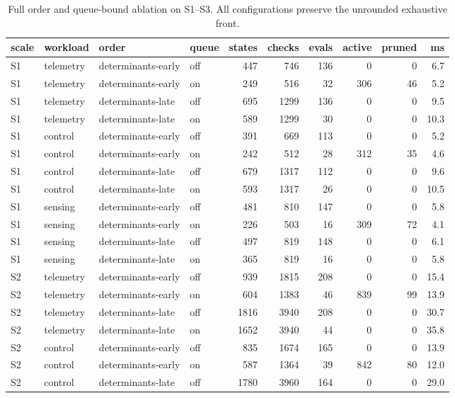 \documentclass[pdflatex,sn-nature]{sn-jnl}
\theoremstyle{thmstyleone}
\theoremstyle{thmstyletwo}
\theoremstyle{thmstylethree}
\begin{document}
\begin{table}[!htbp]\centering
\caption{Full order and queue-bound ablation on S1--S3. All configurations preserve the
unrounded exhaustive front.}\label{tabS7}
{\let\scriptsize\tiny\setlength{\tabcolsep}{2pt}\scriptsize
\begin{tabular}{llllrrrrrr}
\toprule
scale & workload & order & queue & states & checks & evals & active & pruned & ms \\
\midrule
S1 & telemetry & determinants-early & off & 447 & 746 & 136 & 0 & 0 & 6.7 \\
S1 & telemetry & determinants-early & on & 249 & 516 & 32 & 306 & 46 & 5.2 \\
S1 & telemetry & determinants-late & off & 695 & 1299 & 136 & 0 & 0 & 9.5 \\
S1 & telemetry & determinants-late & on & 589 & 1299 & 30 & 0 & 0 & 10.3 \\
S1 & control & determinants-early & off & 391 & 669 & 113 & 0 & 0 & 5.2 \\
S1 & control & determinants-early & on & 242 & 512 & 28 & 312 & 35 & 4.6 \\
S1 & control & determinants-late & off & 679 & 1317 & 112 & 0 & 0 & 9.6 \\
S1 & control & determinants-late & on & 593 & 1317 & 26 & 0 & 0 & 10.5 \\
S1 & sensing & determinants-early & off & 481 & 810 & 147 & 0 & 0 & 5.8 \\
S1 & sensing & determinants-early & on & 226 & 503 & 16 & 309 & 72 & 4.1 \\
S1 & sensing & determinants-late & off & 497 & 819 & 148 & 0 & 0 & 6.1 \\
S1 & sensing & determinants-late & on & 365 & 819 & 16 & 0 & 0 & 5.8 \\
S2 & telemetry & determinants-early & off & 939 & 1815 & 208 & 0 & 0 & 15.4 \\
S2 & telemetry & determinants-early & on & 604 & 1383 & 46 & 839 & 99 & 13.9 \\
S2 & telemetry & determinants-late & off & 1816 & 3940 & 208 & 0 & 0 & 30.7 \\
S2 & telemetry & determinants-late & on & 1652 & 3940 & 44 & 0 & 0 & 35.8 \\
S2 & control & determinants-early & off & 835 & 1674 & 165 & 0 & 0 & 13.9 \\
S2 & control & determinants-early & on & 587 & 1364 & 39 & 842 & 80 & 12.0 \\
S2 & control & determinants-late & off & 1780 & 3960 & 164 & 0 & 0 & 29.0 \\

\end{tabular}}
\end{table}
\end{document}
